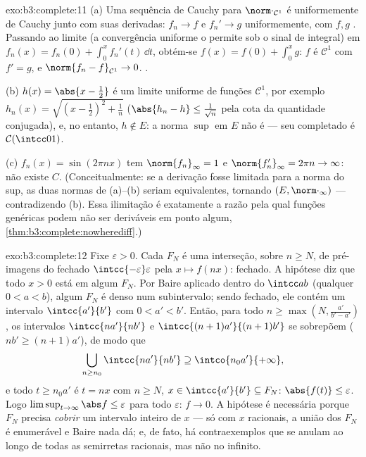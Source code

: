 \begin{solution}{exo:b3:complete:11}
(a) Uma sequência de Cauchy para $\norm\cdot_{\mathcal C^1}$ é
uniformemente de Cauchy junto com suas derivadas: $f_n \to f$
e $f_n' \to g$ uniformemente, com $f, g$ . Passando
ao limite (a convergência uniforme o permite sob o sinal de
integral) em $f_n(x) = f_n(0) + \int_0^xf_n'(t)\,\dd t$,
obtém-se $f(x) = f(0) + \int_0^xg$: $f$ é $\mathcal C^1$ com
$f' = g$, e $\norm{f_n - f}_{\mathcal C^1} \to 0$.
.

(b) $h(x) = \abs{x - \frac12}$ é um limite uniforme de funções
$\mathcal C^1$, por exemplo $h_n(x) = \sqrt{(x -
\frac12)^2 + \frac1n}$ ($\abs{h_n - h} \leq \frac1{\sqrt n}$
pela cota da quantidade conjugada), e, no entanto, $h \notin E$: a
norma $\sup$ em $E$ não é  --- seu completado é
$\mathcal C(\intcc01)$.

(c) $f_n(x) = \sin(2\pi nx)$ tem $\norm{f_n}_\infty = 1$ e
$\norm{f_n'}_\infty = 2\pi n \to \infty$: não existe $C$.
(Conceitualmente: se a derivação fosse limitada para a norma do
sup, as duas normas de (a)--(b) seriam equivalentes, tornando
$(E, \norm\cdot_\infty)$  --- contradizendo (b).
Essa ilimitação é exatamente a razão pela qual funções 
genéricas podem não ser deriváveis em ponto algum,
\cref{thm:b3:complete:nowherediff}.)
\end{solution}

\begin{solution}{exo:b3:complete:12}
Fixe $\varepsilon > 0$. Cada $F_N$ é uma interseção, sobre $n
\geq N$, de pré-imagens do fechado $\intcc{-\varepsilon}
\varepsilon$ pela  $x \mapsto f(nx)$: fechado.
A hipótese diz que todo $x > 0$ está em algum $F_N$. Por
Baire aplicado dentro do  $\intcc ab$ (qualquer $0 < a <
b$), algum $F_N$ é denso num subintervalo; sendo fechado, ele
contém um intervalo $\intcc{a'}{b'}$ com $0 < a' < b'$.
Então, para todo $n \geq \max(N, \frac{a'}{b' - a'})$, os
intervalos $\intcc{na'}{nb'}$ e $\intcc{(n+1)a'}{(n+1)b'}$
se sobrepõem ($nb' \geq (n+1)a'$), de modo que
\[
\bigcup_{n \geq n_0}\intcc{na'}{nb'} \supseteq
\intco{n_0a'}{+\infty},
\]
e todo $t \geq n_0a'$ é $t = nx$ com $n \geq N$, $x \in
\intcc{a'}{b'} \subseteq F_N$: $\abs{f(t)} \leq \varepsilon$.
Logo $\limsup_{t\to\infty}\abs f \leq \varepsilon$ para todo
$\varepsilon$: $f \to 0$. A hipótese  é necessária
porque $F_N$ precisa \emph{cobrir} um intervalo inteiro de $x$
--- só com $x$ racionais, a união dos $F_N$ é
enumerável e Baire nada dá; e, de fato, há
contraexemplos  que se anulam ao longo de todas as semirretas
racionais, mas não no infinito.
\end{solution}

